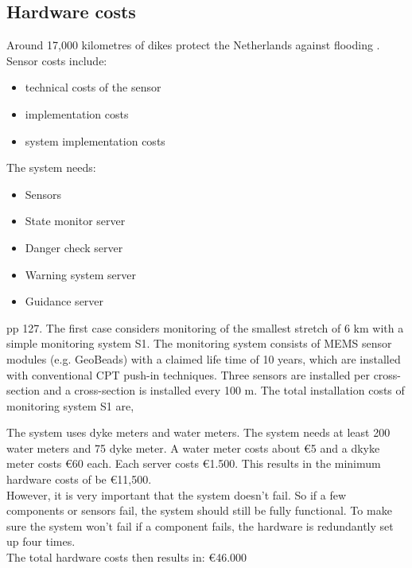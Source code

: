 \subsection{Hardware costs}
Around 17,000 kilometres of dikes protect the Netherlands against flooding \cite{DMC}.
Sensor costs include:
\begin{itemize}
	\item technical costs of the sensor
	\item implementation costs
	\item system implementation costs
\end{itemize}

The system needs:
\begin{itemize}
	\item Sensors
	\item {State monitor server}
	\item {Danger check server}	
	\item {Warning system server}	
	\item {Guidance server}	
\end{itemize}

\cite{UvAPHD} pp 127.
The first case considers monitoring of the smallest stretch of 6 km with a simple monitoring 
system S1. The monitoring system consists of MEMS sensor modules (e.g. GeoBeads) with a claimed life time of 10 years, which are installed with conventional CPT push-in techniques. Three sensors are installed per cross-section and a cross-section is installed every 100 m. The total installation costs of monitoring system S1 are,


The system uses dyke meters and water meters. The system needs at least 200 water meters and 75 dyke meter. A water meter costs about \euro{}5 and a dkyke meter costs \euro{}60 each. Each server costs \euro{}1.500. This results in the minimum hardware costs of be \euro{}11,500. \\
 However, it is very important that the system doesn't fail. So if a few components or sensors fail, the system should still be fully functional. To make sure the system won't fail if a component fails, the hardware is redundantly set up four times.\\
 The total hardware costs then results in: \euro{}46.000

